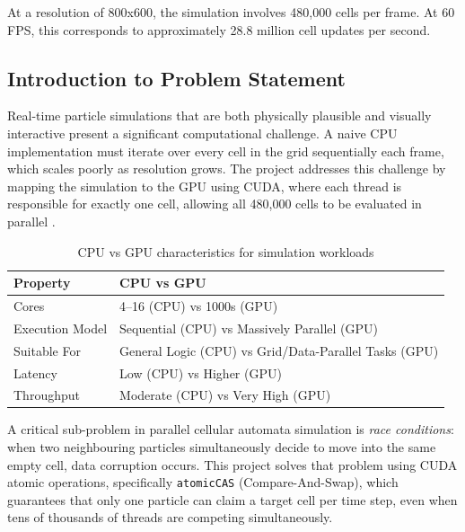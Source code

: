 \documentclass[12pt,a4paper]{article}
\begin{document}
    At a resolution of 800x600, the simulation involves 480,000 cells per frame. 
    At 60 FPS, this corresponds to approximately 28.8 million cell updates per second.

    

	\subsection{Introduction to Problem Statement}
    Real-time particle simulations that are both physically plausible and visually interactive present a 
    significant computational challenge. A naive CPU implementation must iterate over every cell in the 
    grid sequentially each frame, which scales poorly as resolution grows. The project addresses this 
    challenge by mapping the simulation to the GPU using CUDA, where each thread is responsible for 
    exactly one cell, allowing all 480,000 cells to be evaluated in parallel \cite{kirk2016programming}.
    \begin{table}[h]
    \centering
    \begin{tabular}{|l|l|}
    \hline
    \textbf{Property} & \textbf{CPU vs GPU} \\
    \hline
    Cores & 4--16 (CPU) vs 1000s (GPU) \\
    Execution Model & Sequential (CPU) vs Massively Parallel (GPU) \\
    Suitable For & General Logic (CPU) vs Grid/Data-Parallel Tasks (GPU) \\
    Latency & Low (CPU) vs Higher (GPU) \\
    Throughput & Moderate (CPU) vs Very High (GPU) \\
    \hline
    \end{tabular}
    \caption{CPU vs GPU characteristics for simulation workloads}
    \label{tab:cpu_gpu}
    \end{table}

    A critical sub-problem in parallel cellular automata simulation is \textit{race conditions}: when two 
    neighbouring particles simultaneously decide to move into the same empty cell, data corruption occurs. 
    This project solves that problem using CUDA atomic operations, specifically \texttt{atomicCAS} 
    (Compare-And-Swap), which guarantees that only one particle can claim a target cell per time step, 
    even when tens of thousands of threads are competing simultaneously.
\end{document}
